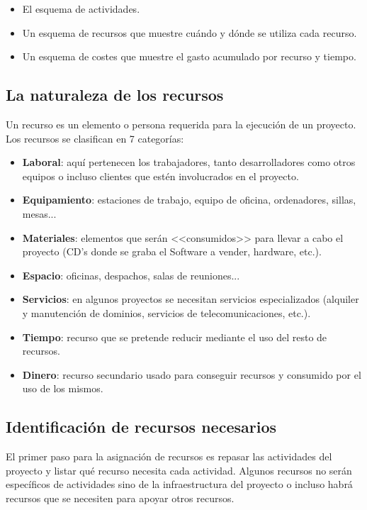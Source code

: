 \documentclass[12pt]{article}
\begin{document}
\begin{itemize}
    \item {El esquema de actividades.}
    \item {Un esquema de recursos que muestre cuándo y dónde se utiliza cada recurso.}
    \item {Un esquema de costes que muestre el gasto acumulado por recurso y tiempo.}
\end{itemize}

\subsection{La naturaleza de los recursos}
\label{8.2.0}

{Un recurso es un elemento o persona requerida para la ejecución de un proyecto. Los recursos se clasifican en 7 categorías:}

\begin{itemize}
    \item {\textbf{Laboral}: aquí pertenecen los trabajadores, tanto desarrolladores como otros equipos o incluso clientes que estén involucrados en el proyecto.}
    \item {\textbf{Equipamiento}: estaciones de trabajo, equipo de oficina, ordenadores, sillas, mesas...}
    \item {\textbf{Materiales}: elementos que serán <<consumidos>> para llevar a cabo el proyecto (CD's donde se graba el Software a vender, hardware, etc.).}
    \item {\textbf{Espacio}: oficinas, despachos, salas de reuniones...}
    \item {\textbf{Servicios}: en algunos proyectos se necesitan servicios especializados (alquiler y manutención de dominios, servicios de telecomunicaciones, etc.).}
    \item {\textbf{Tiempo}: recurso que se pretende reducir mediante el uso del resto de recursos.}
    \item {\textbf{Dinero}: recurso secundario usado para conseguir recursos y consumido por el uso de los mismos.}
\end{itemize}

\subsection{Identificación de recursos necesarios}
\label{8.3.0}

{El primer paso para la asignación de recursos es repasar las actividades del proyecto y listar qué recurso necesita cada actividad. Algunos recursos no serán específicos de actividades sino de la infraestructura del proyecto o incluso habrá recursos que se necesiten para apoyar otros recursos.}
\end{document}
